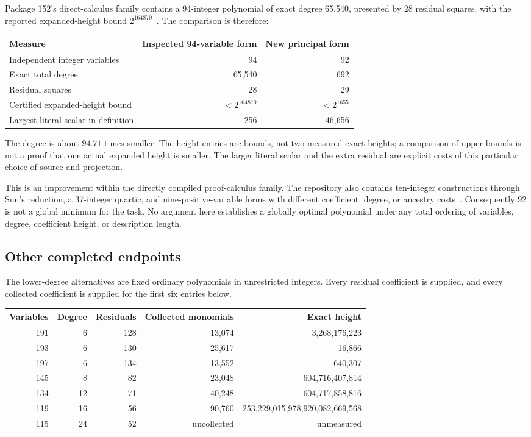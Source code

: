 \documentclass[11pt]{article}
\begin{document}
Package 152's direct-calculus family contains a 94-integer polynomial
of exact degree 65,540, presented by 28 residual squares, with the
reported expanded-height bound $2^{164870}$~\cite{p152}.
The comparison is therefore:
\begin{center}
\begin{tabular}{lrr}
\toprule
Measure & Inspected 94-variable form & New principal form\\
\midrule
Independent integer variables & 94 & 92\\
Exact total degree & 65,540 & 692\\
Residual squares & 28 & 29\\
Certified expanded-height bound & $<2^{164870}$ & $<2^{1655}$\\
Largest literal scalar in definition & 256 & 46,656\\
\bottomrule
\end{tabular}
\end{center}
The degree is about $94.71$ times smaller. The height entries are bounds,
not two measured exact heights; a comparison of upper bounds is not a
proof that one actual expanded height is smaller. The larger literal
scalar and the extra residual are explicit costs of this particular
choice of source and projection.

This is an improvement within the directly compiled proof-calculus
family. The repository also contains ten-integer constructions through
Sun's reduction, a 37-integer quartic, and nine-positive-variable forms
with different coefficient, degree, or ancestry costs~\cite{catalogue}.
Consequently 92 is not a global minimum for the task. No argument here
establishes a globally optimal polynomial under any total ordering of
variables, degree, coefficient height, or description length.

\subsection{Other completed endpoints}

The lower-degree alternatives are fixed ordinary polynomials in
unrestricted integers. Every residual coefficient is supplied, and every
collected coefficient is supplied for the first six entries below.
\begin{center}\small
\begin{tabular}{rrrrr}
\toprule
Variables&Degree&Residuals&Collected monomials&Exact height\\\midrule
191&6&128&13,074&3,268,176,223\\
193&6&130&25,617&16,866\\
197&6&134&13,552&640,307\\
145&8&82&23,048&604,716,407,814\\
134&12&71&40,248&604,717,858,816\\
119&16&56&90,760&253,229,015,978,920,082,669,568\\
115&24&52&uncollected&unmeasured\\
\bottomrule\end{tabular}\end{center}
\end{document}
